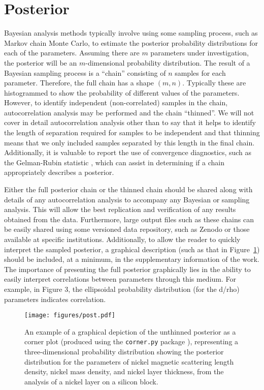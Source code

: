 \documentclass[reprint,superscriptaddress,aps,amsmath,linenumbers]{revtex4-2}
\begin{document}
\section{Posterior}
\label{sec:posterior}

Bayesian analysis methods typically involve using some sampling process, such as Markov chain Monte Carlo, to estimate the posterior probability distributions for each of the parameters. 
Assuming there are $m$ parameters under investigation, the posterior will be an $m$-dimensional probability distribution. 
The result of a Bayesian sampling process is a ``chain'' consisting of $n$ samples for each parameter. 
Therefore, the full chain has a shape $(m, n)$. 
Typically these are histogrammed to show the probability of different values of the parameters. 
However, to identify independent (non-correlated) samples in the chain, autocorrelation analysis \cite{sokal_monte_1997} may be performed and the chain ``thinned''. 
We will not cover in detail autocorrelation analysis other than to say that it helps to identify the length of separation required for samples to be independent and that thinning means that we only included samples separated by this length in the final chain.
Additionally, it is valuable to report the use of convergence diagnostics, such as the Gelman-Rubin statistic \cite{gelman_inference_1992}, which can assist in determining if a chain appropriately describes a posterior. 

Either the full posterior chain or the thinned chain should be shared along with details of any autocorrelation analysis to accompany any Bayesian or sampling analysis. 
This will allow the best replication and verification of any results obtained from the data. 
Furthermore, large output files such as these chains can be easily shared using some versioned data repository, such as Zenodo or those available at specific institutions. 
Additionally, to allow the reader to quickly interpret the sampled posterior, a graphical description (such as that in Figure~\ref{fig:post}) should be included, at a minimum, in the supplementary information of the work. 
The importance of presenting the full posterior graphically lies in the ability to easily interpret correlations between parameters through this medium.
For example, in Figure 3, the ellipsoidal probability distribution (for the d/rho) parameters indicates correlation.
%
\begin{figure}
  \texttt{[image: figures/post.pdf]}
  \caption{
    An example of a graphical depiction of the unthinned posterior as a corner plot (produced using the \texttt{corner.py} package \cite{foremanmackey_corner_2016}), representing a three-dimensional probability distribution showing the posterior distribution for the parameters of nickel magnetic scattering length density, nickel mass density, and nickel layer thickness, from the analysis of a nickel layer on a silicon block.
  }
  \label{fig:post}
\end{figure}
%
\end{document}
